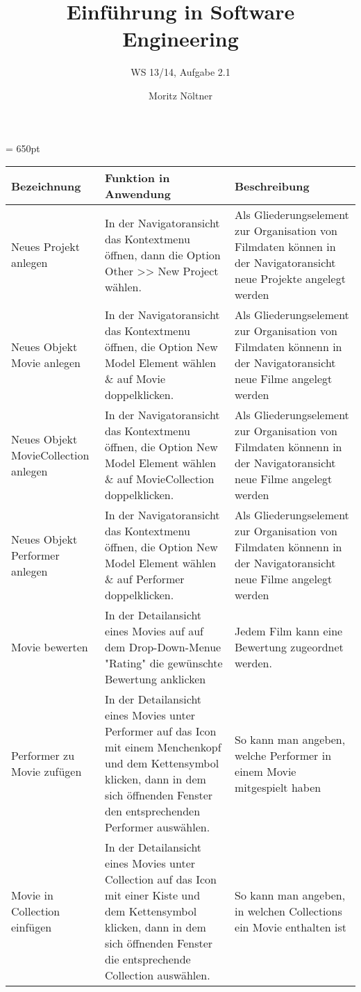 \documentclass[ngerman, landscape]{scrartcl}
\begin{document}
\author{Moritz Nöltner}
\title{Einführung in Software Engineering}
\subtitle{WS 13/14, Aufgabe 2.1}
\maketitle


\textheight = 650pt
\begin{longtable}{|p{8cm}|p{8cm}|p{8cm}|}
	\hline
	\textbf{Bezeichnung} & \textbf{Funktion in Anwendung} & \textbf{Beschreibung} \\
	\hline
	\hline
	Neues Projekt anlegen & In der Navigatoransicht das Kontextmenu öffnen, dann die Option Other >>  New Project wählen. & Als Gliederungselement zur Organisation von Filmdaten können in der Navigatoransicht neue Projekte angelegt werden \\
	\hline
	Neues Objekt Movie anlegen & In der Navigatoransicht das Kontextmenu öffnen, die Option New Model Element wählen \& auf Movie doppelklicken. & Als Gliederungselement zur Organisation von Filmdaten könnenn in der Navigatoransicht neue Filme angelegt werden \\
	\hline
	Neues Objekt MovieCollection anlegen & In der Navigatoransicht das Kontextmenu öffnen, die Option New Model Element wählen \& auf MovieCollection doppelklicken. & Als Gliederungselement zur Organisation von Filmdaten könnenn in der Navigatoransicht neue Filme angelegt werden \\
	\hline
	Neues Objekt Performer anlegen & In der Navigatoransicht das Kontextmenu öffnen, die Option New Model Element wählen \& auf Performer doppelklicken. & Als Gliederungselement zur Organisation von Filmdaten könnenn in der Navigatoransicht neue Filme angelegt werden \\
	\hline
	Movie bewerten & In der Detailansicht eines Movies auf auf dem Drop-Down-Menue "Rating" die gewünschte Bewertung anklicken & Jedem Film  kann eine Bewertung zugeordnet werden. \\
	\hline
	Performer zu Movie zufügen & In der Detailansicht eines Movies unter Performer auf das Icon mit einem Menchenkopf und dem Kettensymbol klicken, dann in dem sich öffnenden Fenster den entsprechenden Performer auswählen. & So kann man angeben, welche Performer in einem Movie mitgespielt haben \\
	\hline
	Movie in Collection einfügen & In der Detailansicht eines Movies unter Collection auf das Icon mit einer Kiste und dem Kettensymbol klicken, dann in dem sich öffnenden Fenster die entsprechende Collection auswählen. & So kann man angeben, in welchen Collections ein Movie enthalten ist \\

\end{longtable}
\end{document}
